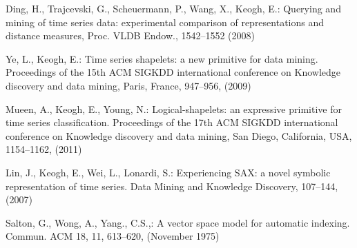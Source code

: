 \documentclass{llncs}
\begin{document}
%
%
\begin{thebibliography}{5}
%

Ding, H., Trajcevski, G., Scheuermann, P., Wang, X., Keogh, E.:
Querying and mining of time series data: experimental comparison of representations and distance measures,
Proc. VLDB Endow., 1542--1552 (2008)

Ye, L., Keogh, E.:
Time series shapelets: a new primitive for data mining.
Proceedings of the 15th ACM SIGKDD international conference on Knowledge discovery and data mining,
Paris, France, 947--956, (2009)

Mueen, A., Keogh, E., Young, N.:
Logical-shapelets: an expressive primitive for time series classification.
Proceedings of the 17th ACM SIGKDD international conference on Knowledge discovery and data mining,
San Diego, California, USA, 1154--1162, (2011)

Lin, J., Keogh, E., Wei, L., Lonardi, S.:
Experiencing SAX: a novel symbolic representation of time series.
Data Mining and Knowledge Discovery, 107--144, (2007)

Salton, G., Wong, A., Yang., C.S.,:
A vector space model for automatic indexing. 
Commun. ACM 18, 11, 613--620, (November 1975)

\end{thebibliography}

%
\end{document}
